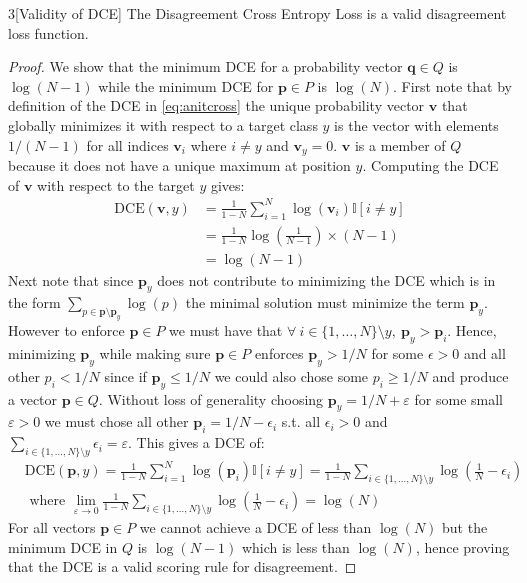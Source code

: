 \begin{manualtheorem}{3}[Validity of DCE]
    The Disagreement Cross Entropy Loss is a valid disagreement loss function.
\end{manualtheorem}
\begin{proof}
    We show that the minimum DCE for a probability vector $\mathbf{q}\in Q$ is $\log(N-1)$ while the minimum DCE for $\mathbf{p}\in P$ is $\log(N)$.
    First note that by definition of the DCE in \autoref{eq:anitcross} the unique probability vector $\mathbf{v}$ that globally minimizes it with respect to a target class $y$ is
    the vector with elements $1/(N-1)$ for all indices $\mathbf{v}_i$ where $i\neq y$ and $\mathbf{v}_y=0$. $\mathbf{v}$ is a member of $Q$ because it does not have a unique maximum at position $y$.
    Computing the DCE of $\mathbf{v}$ with respect to the target $y$ gives:
    \begin{align*}
        \text{DCE}(\mathbf{v}, y) &= \frac{1}{1-N}\sum_{i=1}^N \log(\mathbf{v}_i) \mathbb{I}[i\neq y] \\
        &= \frac{1}{1-N} \log\left(\frac{1}{N-1}\right) \times (N-1)\\
        &=\log(N-1)
    \end{align*}
    Next note that since $\mathbf{p}_y$ does not contribute to minimizing the DCE which is in the form $\sum_{p\in \mathbf{p}\setminus \mathbf{p}_y} \log(p)$ the minimal solution must minimize the term $\mathbf{p}_y$. However to enforce $\mathbf{p}\in P$ we must have that $\forall\ i\in\{1,\ldots,N\}\setminus y,\ \mathbf{p}_y > \mathbf{p}_i$.
    Hence, minimizing $\mathbf{p}_y$ while making sure $\mathbf{p}\in P$ enforces $\mathbf{p}_y > 1/N$ for some $\epsilon > 0$ and all other $p_i < 1/N$ since if $\mathbf{p}_y \leq 1/N$ we could also chose some $p_i \geq 1/N$ and produce a vector $\mathbf{p}\in Q$. Without loss of generality choosing $\mathbf{p}_y = 1/N +\varepsilon$ for some small $\varepsilon > 0$ we must chose all other $\mathbf{p}_i= 1/N - \epsilon_i$ s.t. all $\epsilon_i > 0$ and $\sum_{i\in \{1,\ldots, N\}\setminus y} \epsilon_i = \varepsilon$. This gives a DCE of:
    \begin{align*}
        &\text{DCE}(\mathbf{p}, y) = \frac{1}{1-N}\sum_{i=1}^N \log(\mathbf{p}_i) \mathbb{I}[i\neq y] = \frac{1}{1-N} \sum_{i\in \{1,\ldots, N\}\setminus y} \log\left(\frac{1}{N}-\epsilon_i\right)\\
        &\text{ where } \lim_{\varepsilon\to 0 }\frac{1}{1-N} \sum_{i\in \{1,\ldots, N\}\setminus y} \log\left(\frac{1}{N}-\epsilon_i\right) = \log(N)
    \end{align*}
    For all vectors $\mathbf{p}\in P$ we cannot achieve a DCE of less than $\log(N)$ but the minimum DCE in $Q$ is $\log(N-1)$ which is less than $\log(N)$, hence proving that the DCE is a valid scoring rule for disagreement.
\end{proof}

